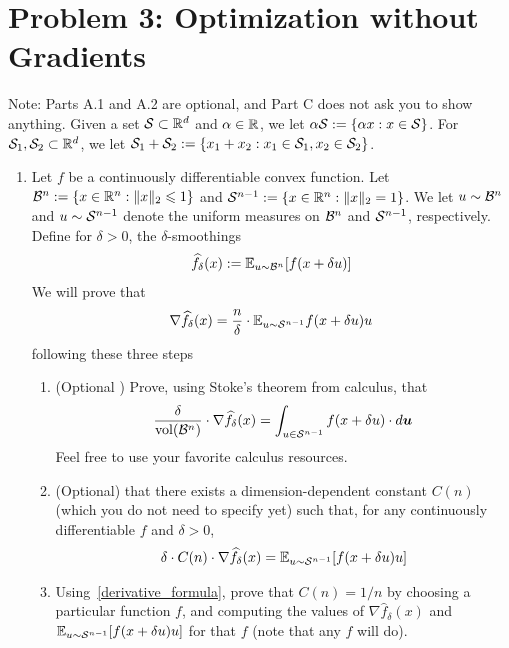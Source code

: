 \documentclass[12pt]{article}
\begin{document}
\newpage
\section*{Problem 3: Optimization without Gradients} 
	Note: Parts A.1 and A.2 are optional, and Part C does not ask you to show anything. Given a set ${\cal S} \subset \mathbb{R}^d$ and $\alpha \in \mathbb{R}$, we let $\alpha {\cal S} := \{\alpha x: x \in {\cal S}\}$. For ${\cal S}_1,{\cal S}_2 \subset \mathbb{R}^d$, we let ${\cal S}_1 + {\cal S}_2 := \{x_1 + x_2: x_1 \in {\cal S}_1, x_2 \in {\cal S}_2\}$. 
	\begin{enumerate}
		\item Let $f$ be a continuously differentiable convex function. Let ${\cal B}^{n} := \{x \in \mathbb{R}^n: \|x\|_2 \leqslant 1\}$ and ${\cal S}^{n-1} := \{x \in \mathbb{R}^n: \|x\|_2 = 1\}$. We let $u \sim {\cal B}^{n}$ and $u \sim {\cal S}^{n-1}$ denote the uniform measures on ${\cal B}^{n}$ and ${\cal S}^{n-1}$, respectively. Define for $\delta > 0$, the $\delta$-smoothings
		\begin{eqnarray}
		\widehat{f}_{\delta}(x) := \mathbb{E}_{u \sim {\cal B}^{n}}[f(x + \delta u)]
		\end{eqnarray}
		We will prove that
		\begin{eqnarray}
		\nabla \widehat{f}_{\delta}(x) = \frac{n}{\delta} \cdot \mathbb{E}_{u \sim {\cal S}^{n-1}} f(x+ \delta u)u
		\end{eqnarray}
		following these three steps
		\begin{enumerate}
			\item (Optional ) Prove, using Stoke's theorem from calculus, that
			\begin{eqnarray}
			\frac{\delta}{\mathrm{vol}({\cal B}^{n})} \cdot \nabla \widehat{f}_{\delta}(x) = \int_{u \in {\cal S}^{n-1}}f(x + \delta u)\cdot d{\bm{u}}
			\end{eqnarray}
			Feel free to use your favorite calculus resources.
			\item (Optional)  that there exists a dimension-dependent constant $C(n)$ (which you do not need to specify yet) such that, for any continuously differentiable $f$ and $\delta > 0$,
			\begin{eqnarray}\label{derivative_formula}
			\delta \cdot C(n)  \cdot \nabla \widehat{f}_{\delta}(x) = \mathbb{E}_{u \sim {\cal S}^{n-1}}[f(x+ \delta u)u]
			\end{eqnarray}
			\item  Using~\eqref{derivative_formula}, prove that $C(n) = 1/n$ by choosing a particular function $f$, and computing the values of $\nabla \widehat{f}_{\delta}(x)$ and $\mathbb{E}_{u \sim {\cal S}^{n-1}}[f(x+ \delta u)u]$ for that $f$ (note that any $f$ will do).

\end{enumerate}
\end{enumerate}
\end{document}
